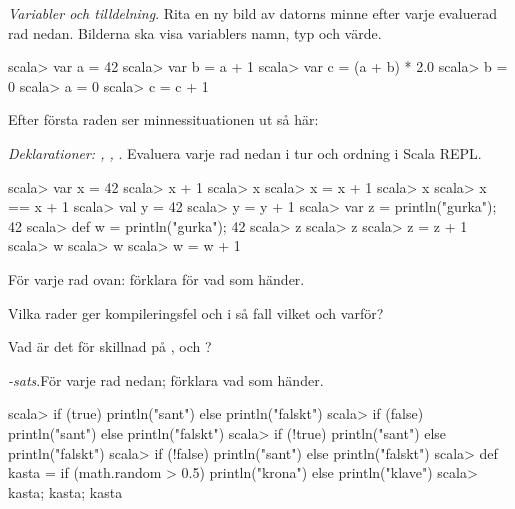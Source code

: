 {{{{\Subtask {}

\Subtask {}

\Subtask {}

\Subtask {}

\Subtask {}

\Subtask {}

\Subtask {}

\Subtask {}

\Subtask {}


\Task\Pen \textit {Variabler och tilldelning}. Rita en ny bild av datorns minne efter varje evaluerad rad nedan. Bilderna ska visa variablers namn, typ och värde. 
\begin{REPL}[numbers=left, numberstyle=\color{black}\ttfamily\scriptsize\selectfont]
scala> var a = 42
scala> var b = a + 1
scala> var c = (a + b) * 2.0
scala> b = 0
scala> a = 0
scala> c = c + 1
\end{REPL}
Efter första raden ser minnessituationen ut så här:

\vspace{0.5em}

\Task \textit{Deklarationer: , , }. Evaluera varje rad nedan i tur och ordning i Scala REPL. 
\begin{REPL}[numbers=left, numberstyle=\color{black}\ttfamily\scriptsize\selectfont]
scala> var x = 42
scala> x + 1
scala> x
scala> x = x + 1
scala> x
scala> x == x + 1
scala> val y = 42
scala> y = y + 1
scala> var z = {println("gurka"); 42}
scala> def w = {println("gurka"); 42}
scala> z
scala> z
scala> z = z + 1
scala> w
scala> w
scala> w = w + 1
\end{REPL}

\Subtask För varje rad ovan: förklara för vad som händer. 

\Subtask Vilka rader ger kompileringsfel och i så fall vilket och varför?

\Subtask\Pen Vad är det för skillnad på ,  och ?

\Task {}\textit{-sats}.För varje rad nedan; förklara vad som händer.
\begin{REPL}[basicstyle=\color{white}\ttfamily\fontsize{9}{11}\selectfont]
scala> if (true) println("sant") else println("falskt")
scala> if (false) println("sant") else println("falskt")
scala> if (!true) println("sant") else println("falskt")
scala> if (!false) println("sant") else println("falskt")
scala> def kasta = if (math.random > 0.5) println("krona") else println("klave")
scala> kasta; kasta; kasta
\end{REPL}


}}}}
